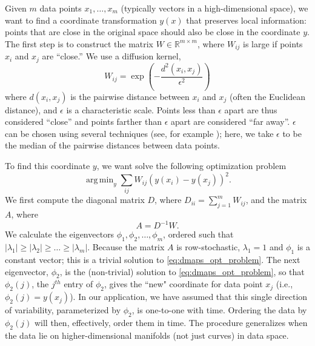 \documentclass{pnastwo}
\DeclareMathOperator*{\argmin}{arg\,min}
\begin{document}
\begin{article}
\begin{materials}
Given $m$ data points $x_1, \dots, x_m$ (typically vectors in a high-dimensional space), we want to find a coordinate transformation $y(x)$ that preserves local information: points that are close in the original space should also be close in the coordinate $y$.
%
The first step is to construct the matrix $W \in \mathbb{R}^{m \times m}$, where $W_{ij}$ is large if points $x_i$ and $x_j$ are ``close.''
%
We use a diffusion kernel,
\begin{equation} \label{eq:dmaps_W}
W_{ij} = \exp \left( -\frac{d^2(x_i, x_j)}{\epsilon^2} \right)
\end{equation}
where $d(x_i, x_j)$ is the pairwise distance between $x_i$ and $x_j$ (often the Euclidean distance), and $\epsilon$ is a characteristic scale.
%
Points less than $\epsilon$ apart are thus considered ``close'' and points farther than $\epsilon$ apart are considered ``far away''.
%
$\epsilon$ can be chosen using several techniques (see, for example \cite{coifman2008graph}); here, we take $\epsilon$ to be the median of the pairwise distances between data points.

To find this coordinate $y$, we want solve the following optimization problem \cite{Belkin2003}
\begin{equation} \label{eq:dmaps_opt_problem}
\argmin_{y} \sum_{ij} W_{ij} (y(x_i) - y(x_j))^2.
\end{equation}
%
We first compute the diagonal matrix $D$, where $D_{ii} = \sum_{j=1}^{m} W_{ij}$, and the matrix $A$, where
\begin{equation} \label{eq:dmaps_A}
A = D^{-1} W.
\end{equation}
%
We calculate the eigenvectors $\phi_1, \phi_2, \dots, \phi_m$, ordered such that $|\lambda_1| \ge |\lambda_2| \ge \dots \ge |\lambda_m|$.
%
%
Because the matrix $A$ is row-stochastic, $\lambda_1=1$ and $\phi_1$ is a constant vector; this is a trivial solution to \eqref{eq:dmaps_opt_problem}.
%
%
The next eigenvector, $\phi_2$, is the (non-trivial) solution to \eqref{eq:dmaps_opt_problem}, so that $\phi_2(j)$, the $j^{th}$ entry of $\phi_2$, gives the ``new" coordinate for data point $x_j$ (i.e., $\phi_2(j) = y(x_j)$).
%
In our application, we have assumed that this single direction of variability, parameterized by $\phi_2$, is one-to-one with time.
%
Ordering the data by $\phi_2(j)$ will then, effectively, order them in time.
%
The procedure generalizes when the data lie on higher-dimensional manifolds (not just curves) in data space.


\end{materials}
\end{article}
\end{document}
